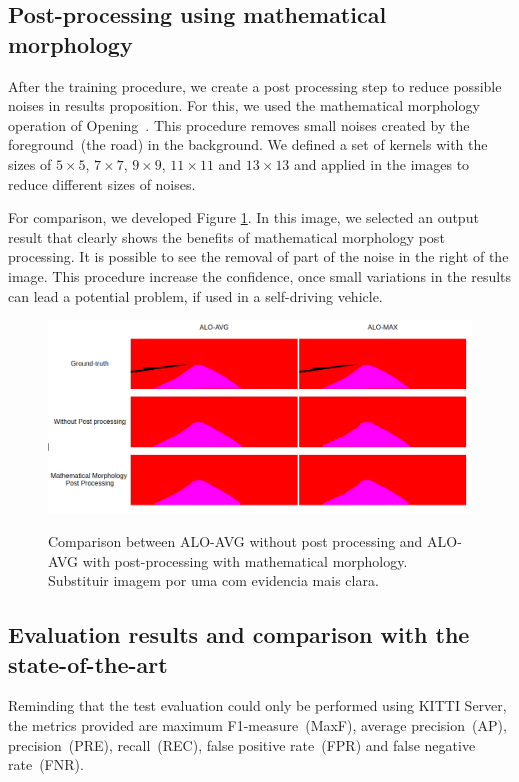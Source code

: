 \subsection{Post-processing using mathematical morphology}

After the training procedure, we create a post processing step to reduce possible noises in results proposition. For this, we used the mathematical morphology operation of Opening~\cite{najman13}. This procedure removes small noises created by the foreground~(the road) in the background. We defined a set of kernels with the sizes of $5\times5$, $7\times7$, $9\times9$, $11\times11$ and $13\times13$ and applied in the images to reduce different sizes of noises. 

For comparison, we developed Figure \ref{fig:post_processing_comp}. In this image, we selected an output result that clearly shows the benefits of mathematical morphology post processing. {\color{red}It is possible to see the removal of part of the noise in the right of the image.} This procedure increase the confidence, once small variations in the results can lead a potential problem, if used in a self-driving vehicle.

\begin{figure}
  \caption{Comparison between ALO-AVG without post processing and ALO-AVG with post-processing with mathematical morphology. {\color{red}Substituir imagem por uma com evidencia mais clara.}}
  \centering
  \includegraphics[width=1.\columnwidth]{figures/falreis/post_processing_comparison.png}
  \label{fig:post_processing_comp}
\end{figure}

\subsection{Evaluation results and comparison with the state-of-the-art}

Reminding that the test evaluation could only be performed using KITTI Server, the metrics provided are maximum F1-measure~(MaxF), average precision~(AP), precision~(PRE), recall~(REC), false positive rate~(FPR) and false negative rate~(FNR). 

